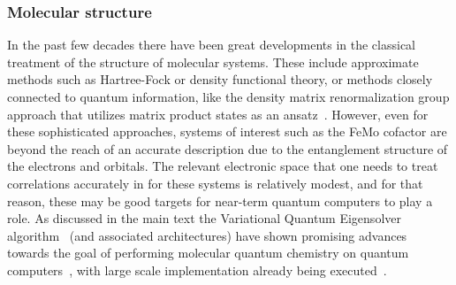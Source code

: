 \documentclass[prx,twocolumn,floatfix,superscriptaddress,longbibliography]{revtex4-1}
\newcommand{\<}{\langle}
\renewcommand{\>}{\rangle}
\begin{document}
\subsubsection{Molecular structure} 
In the past few decades there have been great developments in the classical treatment of the structure of molecular systems. These include  approximate methods such as Hartree-Fock or density functional theory, or methods closely connected to quantum information, like the density matrix renormalization group approach that utilizes matrix product states as an ansatz~\cite{white1992density,chan2011density}.  However, even for these sophisticated approaches, systems of interest such as the FeMo cofactor are beyond the reach of an accurate description due to the entanglement structure of the electrons and orbitals.  The relevant electronic space that one needs to treat correlations accurately in for these systems is relatively modest, and for that reason,  these may be good targets for near-term quantum computers to play a role. As discussed in the main text the Variational Quantum Eigensolver algorithm~\cite{VQE} (and associated architectures)  have shown promising advances towards the goal of performing molecular quantum chemistry on quantum computers~\cite{mcardle2020quantum}, with large scale implementation already being executed~\cite{arute2020hartree}. 
\end{document}
